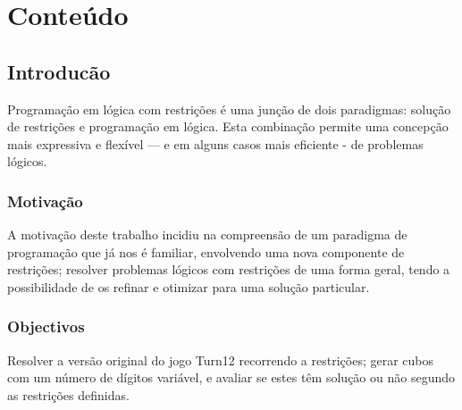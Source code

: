 %
%



\chapter{Conteúdo}
\label{cont}


\section{Introducão}
\label{introduction} %

Programação em lógica com restrições é uma junção de dois paradigmas: solução de restrições e programação em lógica. Esta combinação permite uma concepção mais expressiva e flexível — e em alguns casos mais eficiente - de problemas lógicos.




\subsection{Motivação}
\label{sec:1}
A motivação deste trabalho incidiu na compreensão de um paradigma de programação que já nos é familiar, envolvendo uma nova componente de restrições; resolver problemas lógicos com restrições de uma forma geral, tendo a possibilidade de os refinar e otimizar para uma solução particular.




\subsection{Objectivos}
\label{sec:2}
Resolver a versão original do jogo Turn12 recorrendo a restrições; gerar cubos com um número de dígitos variável, e avaliar se estes têm solução ou não segundo as restrições definidas.



